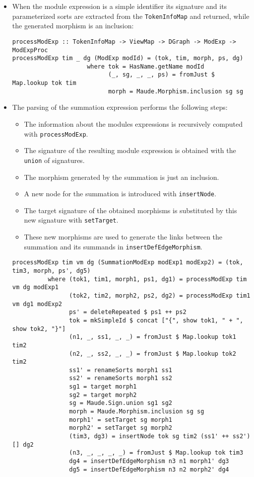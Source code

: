 \begin{itemize}
\item When the module expression is a simple identifier its signature
and its parameterized sorts are extracted from the \verb"TokenInfoMap"
and returned, while the generated morphism is an inclusion:

{\codesize
\begin{verbatim}
processModExp :: TokenInfoMap -> ViewMap -> DGraph -> ModExp -> ModExpProc
processModExp tim _ dg (ModExp modId) = (tok, tim, morph, ps, dg)
                     where tok = HasName.getName modId
                           (_, sg, _, _, ps) = fromJust $ Map.lookup tok tim
                           morph = Maude.Morphism.inclusion sg sg
\end{verbatim}
}

\item The parsing of the summation expression performs the following
steps:

\begin{itemize}
\item The information about the modules expressions is recursively
computed with \verb"processModExp".
\item The signature of the resulting module expression is obtained
with the \verb"union" of signatures.
\item The morphism generated by the summation is just an inclusion.
\item A new node for the summation is introduced with \verb"insertNode".
\item The target signature of the obtained morphisms is substituted
by this new signature with \verb"setTarget".
\item These new morphisms are used to generate the links between the
summation and its summands in \verb"insertDefEdgeMorphism".
\end{itemize}

{\codesize
\begin{verbatim}
processModExp tim vm dg (SummationModExp modExp1 modExp2) = (tok, tim3, morph, ps', dg5)
          where (tok1, tim1, morph1, ps1, dg1) = processModExp tim vm dg modExp1
                (tok2, tim2, morph2, ps2, dg2) = processModExp tim1 vm dg1 modExp2
                ps' = deleteRepeated $ ps1 ++ ps2
                tok = mkSimpleId $ concat ["{", show tok1, " + ", show tok2, "}"]
                (n1, _, ss1, _, _) = fromJust $ Map.lookup tok1 tim2
                (n2, _, ss2, _, _) = fromJust $ Map.lookup tok2 tim2
                ss1' = renameSorts morph1 ss1
                ss2' = renameSorts morph1 ss2
                sg1 = target morph1
                sg2 = target morph2
                sg = Maude.Sign.union sg1 sg2
                morph = Maude.Morphism.inclusion sg sg
                morph1' = setTarget sg morph1
                morph2' = setTarget sg morph2
                (tim3, dg3) = insertNode tok sg tim2 (ss1' ++ ss2') [] dg2
                (n3, _, _, _, _) = fromJust $ Map.lookup tok tim3
                dg4 = insertDefEdgeMorphism n3 n1 morph1' dg3
                dg5 = insertDefEdgeMorphism n3 n2 morph2' dg4
\end{verbatim}
}


\end{itemize}
